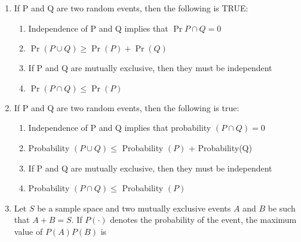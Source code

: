 \begin{enumerate}[label=\thesection.\arabic*.,ref=\thesection.\theenumi]
\item If P and Q are two random events, then the following is TRUE:

\begin{enumerate}

\item Independence of P and Q implies that $\Pr{P \cap Q} = 0$
\item $\Pr(P \cup Q)\geqslant \Pr(P)+\Pr(Q)$
\item If P and Q are mutually exclusive, then they must be independent
\item $\Pr(P \cap Q)\leqslant \Pr(P)$

\end{enumerate}
%
\solution


\item If P and Q are two random events, then the following is true:
\begin{enumerate}[label = (\alph*)]
    \item Independence of P and Q implies that probability $(P\cap Q)=0 $ 
    \item Probability $(P\cup Q) \leq   $ Probability $(P)$ + Probability(Q) 
    \item If P and Q are mutually exclusive, then they must be independent
    \item Probability $(P\cap Q) \leq$ Probability $(P)$
\end{enumerate}
%
\solution


%
\item Let $S$ be a sample space and two mutually exclusive events $A$ and $B$ be such that $A + B = S$. If $P(\cdot)$ denotes the probability of the event, the maximum value of $P(A)P(B)$ is
\\
\solution



\end{enumerate}

